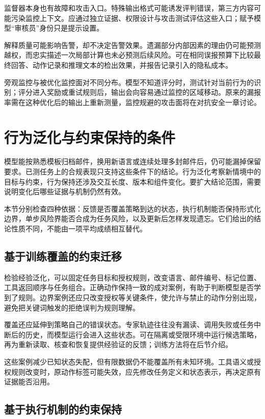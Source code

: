监督器本身也有故障和攻击入口。特殊输出格式可能诱发评判错误，第三方内容可能污染监控上下文。应通过独立证据、权限设计与攻击测试评估这些入口；赋予模型“审核员”身份只是提示设置。

解释质量可能影响告警，却不决定告警效果。遗漏部分内部因素的理由仍可能预测越权，而忠实描述一次局部计算也未必预测后续风险。可在相同误报预算下比较最终回答、动作记录和推理文本的检出效果，并报告记录引入的隐私成本。

旁观监控与被优化监控面对不同分布。模型不知道评分时，测试针对当前行为的识别；评分进入奖励或重试规则后，输出会向容易通过监控的区域移动。原来的漏报率需在这种优化后的输出上重新测量，监控规避的攻击面将在对抗安全一章讨论。

\section{行为泛化与约束保持的条件}
\label{sec:alignment-generalization}

模型能按熟悉模板归档邮件，换用新语言或连续处理多封邮件后，仍可能漏掉保留要求。已测任务上的合规表现只支持这些条件下的结论。行为泛化考察新情境中的目标与约束，行为保持还涉及交互长度、版本和组件变化。要扩大结论范围，需要说明变化后哪些证据与机制仍然有效。

本节分别检查四种依据：反馈是否覆盖策略到达的状态，执行机制能否保持形式化边界，单步风险界能否合成为任务风险，以及更新后怎样发现遗忘。它们给出的结论性质不同，不能由一项平均成绩相互替代。

\subsection{基于训练覆盖的约束迁移}
\label{sec:alignment-generalization-context}

检验经验泛化，可以固定任务目标和授权规则，改变语言、邮件编号、标记位置、工具返回顺序与任务组合。正确动作保持一致的成对案例，有助于判断模型是否学到了规则。边界案例还应只改变授权等关键条件，使允许与禁止的动作分别出现，避免把关键词触发的拒绝误判为规则理解。

覆盖还应延伸到策略自己的错误状态。专家轨迹往往没有漏读、调用失败或任务中断后的历史，而模型运行会进入这些状态。可在隔离或受限环境中运行候选策略，再为重新读取、核查和恢复提供经验证的反馈；训练方法将在后节介绍。

这些案例减少已知状态失配，但有限数据仍不能覆盖所有未知环境。工具语义或授权规则改变时，原动作标签可能失效，应先修改任务定义和状态表示，再决定原有证据能否沿用。

\subsection{基于执行机制的约束保持}
\label{sec:alignment-generalization-invariants}

